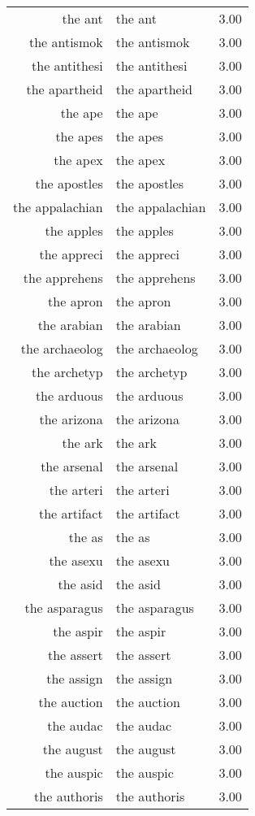 \begin{table}[ht]
\begin{tabular}{rlr}
  the ant & the ant & 3.00 \\ 
  the antismok & the antismok & 3.00 \\ 
  the antithesi & the antithesi & 3.00 \\ 
  the apartheid & the apartheid & 3.00 \\ 
  the ape & the ape & 3.00 \\ 
  the apes & the apes & 3.00 \\ 
  the apex & the apex & 3.00 \\ 
  the apostles & the apostles & 3.00 \\ 
  the appalachian & the appalachian & 3.00 \\ 
  the apples & the apples & 3.00 \\ 
  the appreci & the appreci & 3.00 \\ 
  the apprehens & the apprehens & 3.00 \\ 
  the apron & the apron & 3.00 \\ 
  the arabian & the arabian & 3.00 \\ 
  the archaeolog & the archaeolog & 3.00 \\ 
  the archetyp & the archetyp & 3.00 \\ 
  the arduous & the arduous & 3.00 \\ 
  the arizona & the arizona & 3.00 \\ 
  the ark & the ark & 3.00 \\ 
  the arsenal & the arsenal & 3.00 \\ 
  the arteri & the arteri & 3.00 \\ 
  the artifact & the artifact & 3.00 \\ 
  the as & the as & 3.00 \\ 
  the asexu & the asexu & 3.00 \\ 
  the asid & the asid & 3.00 \\ 
  the asparagus & the asparagus & 3.00 \\ 
  the aspir & the aspir & 3.00 \\ 
  the assert & the assert & 3.00 \\ 
  the assign & the assign & 3.00 \\ 
  the auction & the auction & 3.00 \\ 
  the audac & the audac & 3.00 \\ 
  the august & the august & 3.00 \\ 
  the auspic & the auspic & 3.00 \\ 
  the authoris & the authoris & 3.00 \\ 

\end{tabular}
\end{table}

